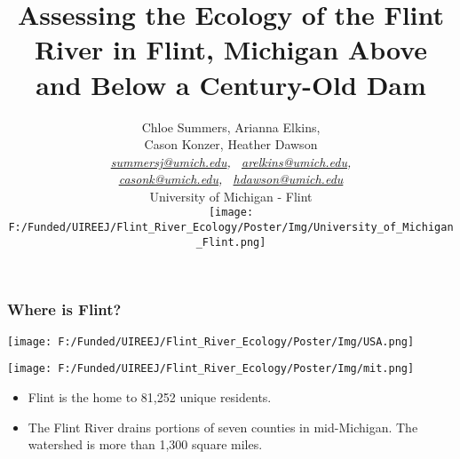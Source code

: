 \documentclass[10pt]{beamer}
\title[Flint River Ecology]{
    Assessing the Ecology of the Flint River in Flint, Michigan Above and Below a Century-Old Dam
}
\author{Chloe Summers, Arianna Elkins, \\ Cason Konzer, Heather Dawson  \\ \vspace{2.5mm}
       \textit{ \color{violet}
       \href{mailto:summersj@umich.edu}{summersj@umich.edu}, \ \href{mailto:arelkins@umich.edu}{arelkins@umich.edu}, \\ \href{mailto:casonk@umich.edu}{casonk@umich.edu}, \ \href{mailto:hdawson@umich.edu}{hdawson@umich.edu}
       } \\ \vspace{2.5mm}
       University of Michigan - Flint \\ \vspace{2.5mm}
       \texttt{[image: F:/Funded/UIREEJ/Flint\_River\_Ecology/Poster/Img/University\_of\_Michigan\_Flint.png]}
}
\date[]{}
\newcommand{\iast}{\item[$\circledast$]}
\begin{document}

\begin{frame}
    \titlepage
\end{frame}






\begin{frame}
    \frametitle{Where is Flint?} %
    \begin{minipage}{0.63\textwidth}
        \begin{center}
          \texttt{[image: F:/Funded/UIREEJ/Flint\_River\_Ecology/Poster/Img/USA.png]}
        \end{center}
    \end{minipage} %
      \begin{minipage}{0.34\textwidth}
        \begin{center}
          \texttt{[image: F:/Funded/UIREEJ/Flint\_River\_Ecology/Poster/Img/mit.png]}
        \end{center}
    \end{minipage} %
    \vspace{5mm}
    \begin{itemize}
      \iast Flint is the home to 81,252 unique residents. %
      \iast The Flint River drains portions of seven counties in mid-Michigan. The watershed is more than 1,300 square miles. 
    \end{itemize}
\end{frame}
\end{document}
